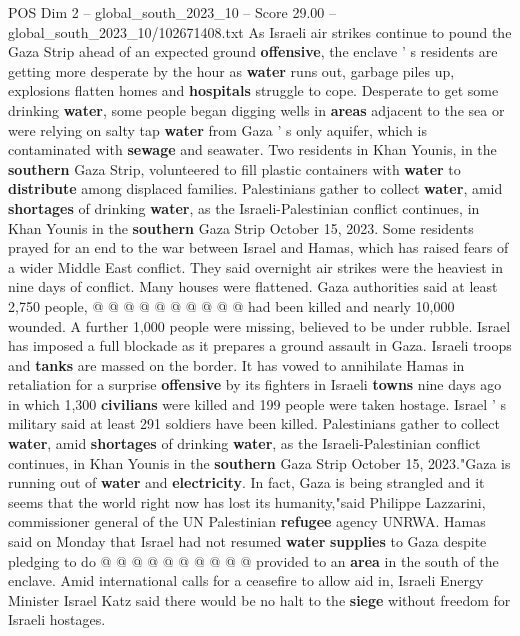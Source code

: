 \begin{textsample}{POS Dim 2 – global\_south\_2023\_10 – Score 29.00 – global\_south\_2023\_10/102671408.txt}  \label{ex:f2_pos_176}
As Israeli air strikes continue to pound the Gaza Strip ahead of an expected ground \textbf{offensive}, the enclave ' s residents are getting more desperate by the hour as \textbf{water} runs out, garbage piles up, explosions flatten homes and \textbf{hospitals} struggle to cope.
Desperate to get some drinking \textbf{water}, some people began digging wells in \textbf{areas} adjacent to the sea or were relying on salty tap \textbf{water} from Gaza ' s only aquifer, which is contaminated with \textbf{sewage} and seawater.
Two residents in Khan Younis, in the \textbf{southern} Gaza Strip, volunteered to fill plastic containers with \textbf{water} to \textbf{distribute} among displaced families.
Palestinians gather to collect \textbf{water}, amid \textbf{shortages} of drinking \textbf{water}, as the Israeli-Palestinian conflict continues, in Khan Younis in the \textbf{southern} Gaza Strip October 15, 2023.
Some residents prayed for an end to the war between Israel and Hamas, which has raised fears of a wider Middle East conflict.
They said overnight air strikes were the heaviest in nine days of conflict.
Many houses were flattened.
Gaza authorities said at least 2,750 people, @ @ @ @ @ @ @ @ @ @ had been killed and nearly 10,000 wounded.
A further 1,000 people were missing, believed to be under rubble.
Israel has imposed a full blockade as it prepares a ground assault in Gaza.
Israeli troops and \textbf{tanks} are massed on the border.
It has vowed to annihilate Hamas in retaliation for a surprise \textbf{offensive} by its fighters in Israeli \textbf{towns} nine days ago in which 1,300 \textbf{civilians} were killed and 199 people were taken hostage.
Israel ' s military said at least 291 soldiers have been killed.
Palestinians gather to collect \textbf{water}, amid \textbf{shortages} of drinking \textbf{water}, as the Israeli-Palestinian conflict continues, in Khan Younis in the \textbf{southern} Gaza Strip October 15, 2023."Gaza is running out of \textbf{water} and \textbf{electricity}.
In fact, Gaza is being strangled and it seems that the world right now has lost its humanity,"said Philippe Lazzarini, commissioner general of the UN Palestinian \textbf{refugee} agency UNRWA.
Hamas said on Monday that Israel had not resumed \textbf{water} \textbf{supplies} to Gaza despite pledging to do @ @ @ @ @ @ @ @ @ @ provided to an \textbf{area} in the south of the enclave.
Amid international calls for a ceasefire to allow aid in, Israeli Energy Minister Israel Katz said there would be no halt to the \textbf{siege} without freedom for Israeli hostages.

\end{textsample}
